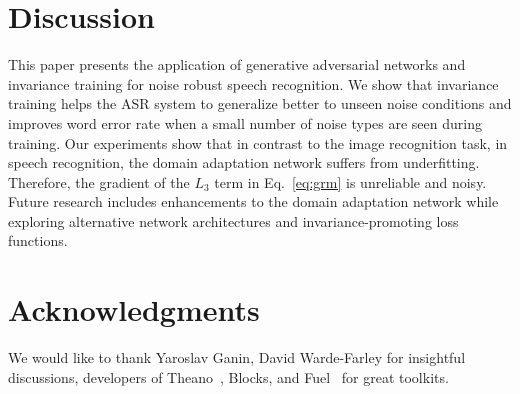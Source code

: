 \documentclass{article}
\begin{document}
\section{Discussion}
\label{sec:discussion}
    This paper presents the application of generative adversarial networks and invariance training for noise robust speech recognition. We show that invariance training 
    helps the ASR system to generalize better to unseen noise conditions and improves word error rate when a small number of noise types are seen during training. Our 
    experiments show that in contrast to the image recognition task, in speech recognition,  the domain adaptation network suffers from underfitting. Therefore, the 
    gradient of the $L_3$ term in Eq.~\ref{eq:grm} is unreliable and noisy. Future research includes enhancements to the domain adaptation network while exploring alternative network architectures and invariance-promoting loss functions.
        


\section*{Acknowledgments}

We would like to thank Yaroslav Ganin, David Warde-Farley for insightful discussions,
developers of Theano~\cite{2016arXiv160502688short}, Blocks, and Fuel~\cite{MerrienboerBDSW15} 
for great toolkits.

%


\end{document}
